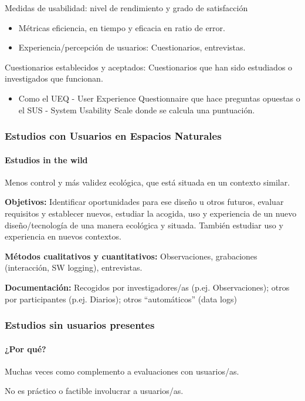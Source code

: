 \documentclass[12pt, twoside, openright]{report} %
\begin{document}
Medidas de usabilidad: nivel de rendimiento y grado de satisfacción
\begin{itemize}
	\item Métricas eficiencia, en tiempo y eficacia en ratio de error.
	\item Experiencia/percepción de usuarios: Cuestionarios, entrevistas.
\end{itemize}
Cuestionarios establecidos y aceptados: Cuestionarios que han sido estudiados o investigados que funcionan.
\begin{itemize}
	\item Como el UEQ - User Experience Questionnaire que hace preguntas opuestas o el SUS - System Usability Scale donde se calcula una puntuación.
\end{itemize}

\subsubsection{Estudios con Usuarios en Espacios Naturales}
\paragraph{Estudios in the wild}
Menos control y más validez ecológica, que está situada en un contexto similar.

\textbf{Objetivos:} Identificar oportunidades para ese diseño u otros futuros, evaluar requisitos y establecer nuevos, estudiar la acogida, uso y experiencia de un nuevo diseño/tecnología de una manera ecológica y situada. También estudiar uso y experiencia en nuevos contextos.

\textbf{Métodos cualitativos y cuantitativos:} Observaciones, grabaciones (interacción, SW logging), entrevistas.

\textbf{Documentación:} Recogidos por investigadores/as (p.ej. Observaciones); otros por participantes (p.ej. Diarios); otros “automáticos” (data logs)

\subsubsection{Estudios sin usuarios presentes}
\paragraph{¿Por qué?}
Muchas veces como complemento a evaluaciones con usuarios/as.

No es práctico o factible involucrar a usuarios/as.
\end{document}
